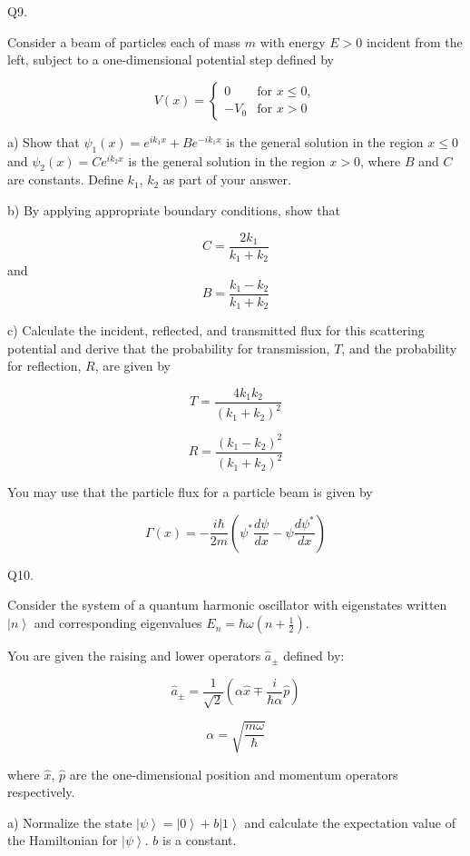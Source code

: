 \documentclass[a4paper,11pt]{article}
\begin{document}
\medskip

Q9. 

Consider a beam of particles each of mass \( m \) with energy \( E > 0 \) incident from the left, subject to a one-dimensional potential step defined by

\[ V(x) = \begin{cases}
0 & \text{for } x \leq 0,\\
-V_{0}  & \text{for } x > 0 
\end{cases} \]

a) Show that \( \psi_{1}(x) = e^{ik_{1}x} + Be^{-ik_{1}x} \) is the general solution in the region \( x \leq 0 \) and \( \psi_{2}(x) = Ce^{ik_{2}x} \) is the general solution in the region \( x > 0 \), where \( B \) and \( C \) are constants. Define \( k_{1} \), \( k_{2} \) as part of your answer.

b) By applying appropriate boundary conditions, show that 

\[ C = \frac{2k_{1}}{k_{1}+k_{2}} \] and \[ B = \frac{k_{1}-k_{2}}{k_{1}+k_{2}} \]

c) Calculate the incident, reflected, and transmitted flux for this scattering potential and derive that the probability for transmission, \( T \), and the probability for reflection, \( R \), are given by 

\[ T = \frac{4k_{1}k_{2}}{(k_{1}+k_{2})^{2}} \]

\[ R = \frac{(k_{1}-k_{2})^{2}}{(k_{1}+k_{2})^{2}} \]

You may use that the particle flux for a particle beam is given by 

\[ \Gamma(x) = -\frac{i\hbar}{2m} \left(\psi^{*}\frac{d\psi}{dx} - \psi\frac{d\psi^{*}}{dx} \right) \]

Q10.

Consider the system of a quantum harmonic oscillator with eigenstates written \( \left| n \right> \) and corresponding eigenvalues \( E_{n} = \hbar\omega(n+\frac{1}{2}) \).

You are given the raising and lower operators \( \hat{a}_{\pm} \) defined by:

\[ \hat{a}_{\pm} = \frac{1}{\sqrt{2}}(\alpha \hat{x} \mp \frac{i}{\hbar\alpha} \hat{p}) \]

\[ \alpha = \sqrt{\frac{m\omega}{\hbar}} \]

where \( \hat{x} \), \( \hat{p} \) are the one-dimensional position and momentum operators respectively.

\medskip

a) Normalize the state \( \left| \psi \right> =  \left| 0 \right> + b \left| 1 \right> \) and calculate the expectation value of the Hamiltonian for \( \left| \psi \right> \). \( b \) is a constant.
\end{document}
